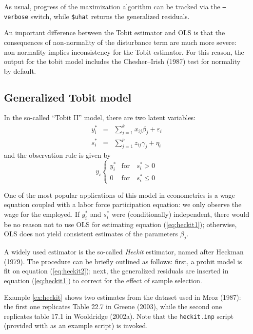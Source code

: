 As usual, progress of the maximization algorithm can be tracked via
the \texttt{--verbose} switch, while \verb+$uhat+ returns the
generalized residuals.

An important difference between the Tobit estimator and OLS is that
the consequences of non-normality of the disturbance term are much
more severe: non-normality implies inconsistency for the Tobit
estimator. For this reason, the output for the tobit model includes
the Chesher--Irish (1987) test for normality by default.

\subsection{Generalized Tobit model}
\label{sec:heckit}

In the so-called ``Tobit II'' model, there are two latent variables:
%
\begin{eqnarray}
  \label{eq:heckit1}
  y^*_i & = & \sum_{j=1}^k x_{ij} \beta_j + \varepsilon_i \\
  \label{eq:heckit2}
  s^*_i & = & \sum_{j=1}^p z_{ij} \gamma_j + \eta_i 
\end{eqnarray}
%
and the observation rule is given by
%
\begin{equation}
  \label{eq:tobitII}
  y_i \left\{ 
    \begin{array}{ll} 
      y^*_i & \mathrm{for} \quad s^*_i > 0 \\ 
      0 & \mathrm{for} \quad s^*_i \le 0 
    \end{array}
    \right. 
\end{equation}

One of the most popular applications of this model in econometrics is
a wage equation coupled with a labor force participation equation: we
only observe the wage for the employed. If $y^*_i$ and $s^*_i$ were
(conditionally) independent, there would be no reason not to use OLS
for estimating equation (\ref{eq:heckit1}); otherwise, OLS does not
yield consistent estimates of the parameters $\beta_j$.

A widely used estimator is the so-called \emph{Heckit} estimator,
named after Heckman (1979). The procedure can be briefly outlined as
follows: first, a probit model is fit on equation (\ref{eq:heckit2});
next, the generalized residuals are inserted in equation
(\ref{eq:heckit1}) to correct for the effect of sample selection.

Example \ref{ex:heckit} shows two estimates from the dataset used in
Mroz (1987): the first one replicates Table 22.7 in Greene (2003),
while the second one replicates table 17.1 in Wooldridge (2002a). Note
that the \texttt{heckit.inp} script (provided with  as an
example script) is invoked.

